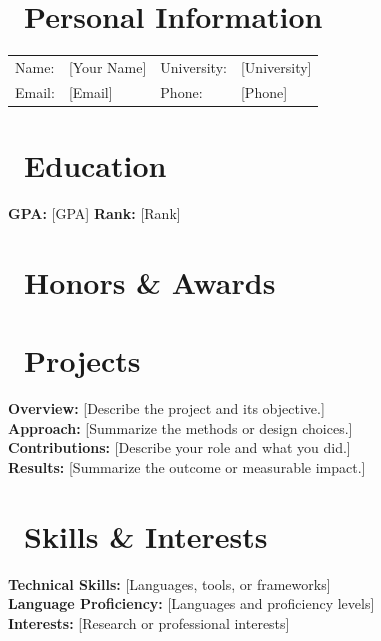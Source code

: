 \documentclass{resume}
\begin{document}
\renewcommand{\arraystretch}{1.15}

\noindent
\begin{minipage}[c]{0.82\textwidth}
    \section*{\faGraduationCap\ Personal Information}
    \begin{tabularx}{\linewidth}{@{}lX lX@{}}
        Name:  & [Your Name] & University: & [University] \\
        Email: & [Email]     & Phone:      & [Phone] \\
    \end{tabularx}
\end{minipage}\hfill
\begin{minipage}[c]{0.12\textwidth}
\end{minipage}\par

\section{\faHome\ Education}
\datedsubsection{\textbf{[University]}}{[City]}
\textbf{GPA:} [GPA] \qquad \textbf{Rank:} [Rank]

\section{\faHeartO\ Honors \& Awards}

\section{\faUsers\ Projects}
\textbf{Overview:} [Describe the project and its objective.] \\
\textbf{Approach:} [Summarize the methods or design choices.] \\
\textbf{Contributions:} [Describe your role and what you did.] \\
\textbf{Results:} [Summarize the outcome or measurable impact.]

\section{\faCogs\ Skills \& Interests}
\textbf{Technical Skills:} [Languages, tools, or frameworks] \\
\textbf{Language Proficiency:} [Languages and proficiency levels] \\
\textbf{Interests:} [Research or professional interests]
\end{document}
